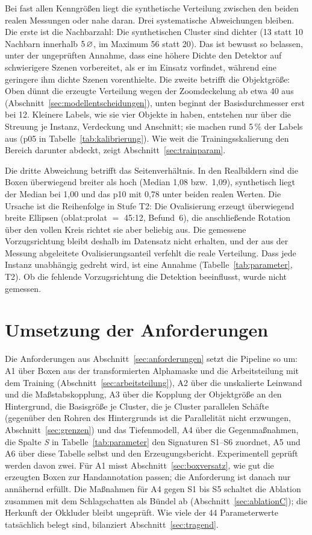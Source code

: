 Bei fast allen Kenngrößen liegt die synthetische Verteilung zwischen den beiden
realen Messungen oder nahe daran. Drei systematische Abweichungen bleiben. Die
erste ist die Nachbarzahl: Die synthetischen Cluster sind dichter (13 statt 10
Nachbarn innerhalb $5\,\varnothing$, im Maximum 56 statt 20). Das ist bewusst so
belassen, unter der ungeprüften Annahme, dass eine höhere Dichte den Detektor
auf schwierigere Szenen vorbereitet, als er im Einsatz vorfindet, während eine
geringere ihm dichte Szenen vorenthielte. Die zweite betrifft die Objektgröße:
Oben dünnt die erzeugte Verteilung wegen der Zoomdeckelung ab etwa 40\px{} aus
(Abschnitt~\ref{sec:modellentscheidungen}), unten beginnt der Basisdurchmesser
erst bei 12\px. Kleinere Labels, wie sie vier Objekte in  haben,
entstehen nur über die Streuung je Instanz, Verdeckung und Anschnitt; sie
machen rund 5\,\% der Labels aus (p05 in Tabelle~\ref{tab:kalibrierung}). Wie
weit die Trainingsskalierung den Bereich darunter abdeckt, zeigt
Abschnitt~\ref{sec:trainparam}.

Die dritte Abweichung betrifft das Seitenverhältnis. In den Realbildern sind
die Boxen überwiegend breiter als hoch (Median 1,08 bzw.\ 1,09), synthetisch
liegt der Median bei 1,00 und das p10 mit 0,78 unter beiden realen Werten.
Die Ursache ist die Reihenfolge in Stufe T2: Die Ovalisierung erzeugt
überwiegend breite Ellipsen (oblat:prolat $=$ 45:12, Befund~6), die
anschließende Rotation über den vollen Kreis richtet sie aber beliebig aus.
Die gemessene Vorzugsrichtung bleibt deshalb im Datensatz nicht erhalten, und
der aus der Messung abgeleitete Ovalisierungsanteil verfehlt die reale
Verteilung.
Dass jede Instanz unabhängig gedreht wird,
ist eine Annahme (Tabelle~\ref{tab:parameter}, T2). Ob die fehlende
Vorzugsrichtung die Detektion beeinflusst, wurde nicht gemessen.

\section{Umsetzung der Anforderungen}
\label{sec:nachweis}

Die Anforderungen aus Abschnitt~\ref{sec:anforderungen} setzt die Pipeline so
um: A1 über Boxen aus der transformierten Alphamaske und die Arbeitsteilung
mit dem Training (Abschnitt~\ref{sec:arbeitsteilung}), A2 über die unskalierte
Leinwand und die Maßstabskopplung, A3 über die Kopplung der Objektgröße an den
Hintergrund, die Basisgröße je Cluster, die je Cluster parallelen Schäfte
(gegenüber den Rohren des Hintergrunds ist die Parallelität nicht erzwungen,
Abschnitt~\ref{sec:grenzen}) und das Tiefenmodell, A4 über die Gegenmaßnahmen, die Spalte \emph{S} in
Tabelle~\ref{tab:parameter} den Signaturen S1--S6 zuordnet, A5 und A6 über
diese Tabelle selbst und den Erzeugungsbericht. Experimentell geprüft werden
davon zwei. Für A1 misst Abschnitt~\ref{sec:boxversatz}, wie gut die erzeugten
Boxen zur Handannotation passen; die Anforderung ist danach nur annähernd
erfüllt. Die Maßnahmen für A4 gegen S1 bis S5 schaltet die Ablation zusammen
mit dem Schlagschatten als Bündel ab (Abschnitt~\ref{sec:ablationC}); die
Herkunft der Okkluder bleibt ungeprüft. Wie viele der 44 Parameterwerte tatsächlich belegt sind,
bilanziert Abschnitt~\ref{sec:tragend}.